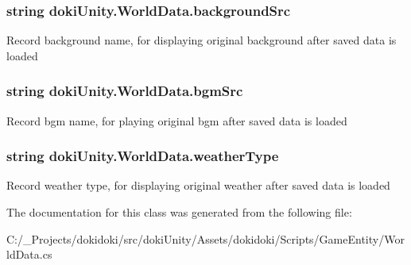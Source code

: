 \subsubsection[{\texorpdfstring{background\+Src}{backgroundSrc}}]{\setlength{\rightskip}{0pt plus 5cm}string doki\+Unity.\+World\+Data.\+background\+Src}\hypertarget{classdoki_unity_1_1_world_data_a2447e6d10e01eefcd655ea1ec9a21bf7}{}\label{classdoki_unity_1_1_world_data_a2447e6d10e01eefcd655ea1ec9a21bf7}


Record background name, for displaying original background after saved data is loaded 

\subsubsection[{\texorpdfstring{bgm\+Src}{bgmSrc}}]{\setlength{\rightskip}{0pt plus 5cm}string doki\+Unity.\+World\+Data.\+bgm\+Src}\hypertarget{classdoki_unity_1_1_world_data_ad4f271186461614e00dd6b33e7fde52c}{}\label{classdoki_unity_1_1_world_data_ad4f271186461614e00dd6b33e7fde52c}


Record bgm name, for playing original bgm after saved data is loaded 

\subsubsection[{\texorpdfstring{weather\+Type}{weatherType}}]{\setlength{\rightskip}{0pt plus 5cm}string doki\+Unity.\+World\+Data.\+weather\+Type}\hypertarget{classdoki_unity_1_1_world_data_a96b2cbfa143cff7922f02bb4c8fb0f38}{}\label{classdoki_unity_1_1_world_data_a96b2cbfa143cff7922f02bb4c8fb0f38}


Record weather type, for displaying original weather after saved data is loaded 



The documentation for this class was generated from the following file\+:\begin{DoxyCompactItemize}
\item 
C\+:/\+\_\+\+Projects/dokidoki/src/doki\+Unity/\+Assets/dokidoki/\+Scripts/\+Game\+Entity/World\+Data.\+cs\end{DoxyCompactItemize}
